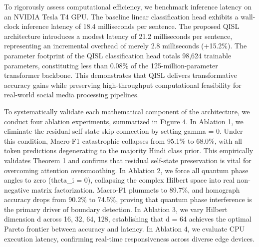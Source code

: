 \documentclass[10pt,twocolumn,letterpaper]{article}
\theoremstyle{definition}
\begin{document}
To rigorously assess computational efficiency, we benchmark inference latency on an NVIDIA Tesla T4 GPU. The baseline linear classification head exhibits a wall-clock inference latency of 18.4 milliseconds per sentence. The proposed QISL architecture introduces a modest latency of 21.2 milliseconds per sentence, representing an incremental overhead of merely 2.8 milliseconds (+15.2\%). The parameter footprint of the QISL classification head totals 98,624 trainable parameters, constituting less than 0.08\% of the 125-million-parameter transformer backbone. This demonstrates that QISL delivers transformative accuracy gains while preserving high-throughput computational feasibility for real-world social media processing pipelines.

To systematically validate each mathematical component of the architecture, we conduct four ablation experiments, summarized in Figure 4. In Ablation 1, we eliminate the residual self-state skip connection by setting gamma = 0. Under this condition, Macro-F1 catastrophic collapses from 95.1\% to 68.0\%, with all token predictions degenerating to the majority Hindi class prior. This empirically validates Theorem 1 and confirms that residual self-state preservation is vital for overcoming attention oversmoothing. In Ablation 2, we force all quantum phase angles to zero (theta\_i = 0), collapsing the complex Hilbert space into real non-negative matrix factorization. Macro-F1 plummets to 89.7\%, and homograph accuracy drops from 90.2\% to 74.5\%, proving that quantum phase interference is the primary driver of boundary detection. In Ablation 3, we vary Hilbert dimension d across {16, 32, 64, 128}, establishing that d = 64 achieves the optimal Pareto frontier between accuracy and latency. In Ablation 4, we evaluate CPU execution latency, confirming real-time responsiveness across diverse edge devices.
\end{document}
